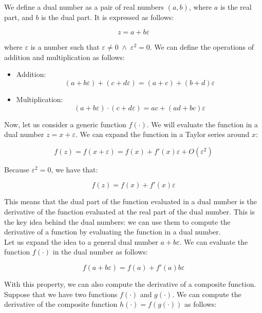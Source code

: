 We define a dual number as a pair of real numbers $(a, b)$, where $a$ is the real part, and $b$ is the dual part.
It is expressed as follows:

\begin{equation}
    z = a + b \varepsilon
\end{equation}

where $\varepsilon$ is a number such that $\varepsilon \neq 0 \; \wedge \; \varepsilon^2 = 0$. 
We can define the operations of addition and multiplication as follows:

\begin{itemize}
    \item Addition: 
    $$(a + b \varepsilon) + (c + d \varepsilon) = (a + c) + (b + d) \varepsilon$$

    \item Multiplication: 
   $$(a + b \varepsilon) \cdot (c + d \varepsilon) = ac + (ad + bc) \varepsilon$$

\end{itemize}

Now, let us consider a generic function $f(\cdot)$. We will evaluate the function in a 
dual number $z = x + \varepsilon$. We can expand the function in a Taylor series around $x$:

\begin{equation}
    f(z) = f(x + \varepsilon) = f(x) + f'(x) \varepsilon + O(\varepsilon^2)
\end{equation}

Because $\varepsilon^2 = 0$, we have that:

\begin{equation}
    f(z) = f(x) + f'(x) \varepsilon
\end{equation}

This means that the dual part of the function evaluated in a dual number is the derivative of the function
evaluated at the real part of the dual number. This is the key idea behind the dual numbers: we can use them
to compute the derivative of a function by evaluating the function in a dual number.\\

Let us expand the idea to a general dual number $a + b \varepsilon$. We can evaluate the function $f(\cdot)$
in the dual number as follows:

\begin{equation}
    f(a + b \varepsilon) = f(a) + f'(a) b \varepsilon
\end{equation}

With this property, we can also compute the derivative of a composite function. Suppose that we 
have two functions $f(\cdot)$ and $g(\cdot)$. We can compute the derivative of the composite 
function $h(\cdot) = f(g(\cdot))$ as follows:

